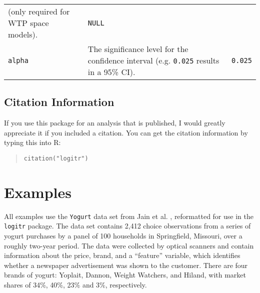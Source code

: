 \documentclass[article]{jss}
\begin{document}
\begin{longtable}[]{@{}lll@{}}
\begin{minipage}[t]{0.66\columnwidth}
(only required for WTP space models).\strut
\end{minipage} & \begin{minipage}[t]{0.11\columnwidth}\raggedright
\texttt{NULL}\strut
\end{minipage}\tabularnewline
\begin{minipage}[t]{0.14\columnwidth}\raggedright
\texttt{alpha}\strut
\end{minipage} & \begin{minipage}[t]{0.66\columnwidth}\raggedright
The significance level for the confidence interval (e.g. \texttt{0.025}
results in a 95\% CI).\strut
\end{minipage} & \begin{minipage}[t]{0.11\columnwidth}\raggedright
\texttt{0.025}\strut
\end{minipage}\tabularnewline
\bottomrule
\end{longtable}

\hypertarget{citation-information}{%
\subsection{Citation Information}\label{citation-information}}

If you use this package for an analysis that is published, I would
greatly appreciate it if you included a citation. You can get the
citation information by typing this into R:

\begin{quote}
\texttt{citation("logitr")}
\end{quote}

\newpage

\hypertarget{examples}{%
\section{Examples}\label{examples}}

All examples use the \texttt{Yogurt} data set from Jain et al.
\citeyearpar{Jain1994}, reformatted for use in the \texttt{logitr}
package. The data set contains 2,412 choice observations from a series
of yogurt purchases by a panel of 100 households in Springfield,
Missouri, over a roughly two-year period. The data were collected by
optical scanners and contain information about the price, brand, and a
``feature'' variable, which identifies whether a newspaper advertisement
was shown to the customer. There are four brands of yogurt: Yoplait,
Dannon, Weight Watchers, and Hiland, with market shares of 34\%, 40\%,
23\% and 3\%, respectively.
\end{document}
